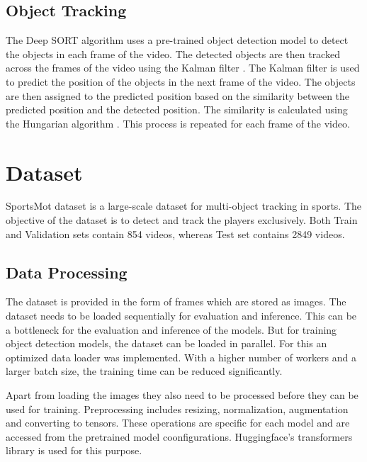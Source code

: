 \documentclass[runningheads]{llncs}
\begin{document}
\subsection{Object Tracking}
The Deep SORT algorithm uses a pre-trained object detection model to detect the objects in each frame of the video.
The detected objects are then tracked across the frames of the video using the Kalman filter \cite{kalman1960new}.
The Kalman filter is used to predict the position of the objects in the next frame of the video.
The objects are then assigned to the predicted position based on the similarity between the predicted position and the detected position.
The similarity is calculated using the Hungarian algorithm \cite{hungarian1955}.
This process is repeated for each frame of the video.


\section{Dataset}

SportsMot dataset \cite{cui2023sportsmot} is a large-scale dataset for multi-object tracking in sports.
The objective of the dataset is to detect and track the players exclusively.
Both Train and Validation sets contain 854 videos, whereas Test set contains 2849 videos.

\subsection{Data Processing}
The dataset is provided in the form of frames which are stored as images.
The dataset needs to be loaded sequentially for evaluation and inference.
This can be a bottleneck for the evaluation and inference of the models.
But for training object detection models, the dataset can be loaded in parallel.
For this an optimized data loader was implemented.
With a higher number of workers and a larger batch size, the training time can be reduced significantly.

Apart from loading the images they also need to be processed before they can be used for training.
Preprocessing includes resizing, normalization, augmentation and converting to tensors.
These operations are specific for each model and are accessed from the pretrained model coonfigurations.
Huggingface's transformers library \cite{wolf-etal-2020-transformers} is used for this purpose.
\end{document}
